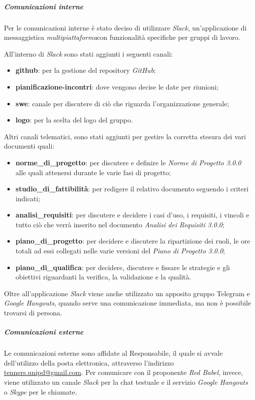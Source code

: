    		\subparagraph*{Comunicazioni interne}
   		Per le comunicazioni interne è stato deciso di utilizzare \textit{ Slack\glos}, un'applicazione di messaggistica \textit{multipiattaforma}\glo con funzionalità specifiche per gruppi di lavoro.

   		\noindent All'interno di \textit{Slack\glo} sono stati aggiunti i seguenti canali:
   		\begin{itemize}
   			\item \textbf{github}: per la gestione del repository \textit{GitHub\glos};
   			\item \textbf{pianificazione-incontri}: dove vengono decise le date per riunioni;
   			\item \textbf{swe}: canale per discutere di ciò che riguarda l'organizzazione generale;
   			\item \textbf{logo}: per la scelta del logo del gruppo.

   		\end{itemize}
   		Altri canali telematici, sono stati aggiunti per gestire la corretta stesura dei vari documenti quali:
   		\begin{itemize}
   			\item \textbf{norme\_di\_progetto}: per discutere e definire le \textit{Norme di Progetto 3.0.0\doc} alle quali attenersi durante le varie fasi di progetto;
   			\item \textbf{studio\_di\_fattibilità}: per redigere il relativo documento seguendo i criteri indicati;
   			\item \textbf{analisi\_requisiti}: per discutere e decidere i casi d'uso, i requisiti, i vincoli e tutto ciò che verrà inserito nel documento \textit{Analisi dei Requisiti 3.0.0\docs};
   			\item \textbf{piano\_di\_progetto}: per decidere e discutere la ripartizione dei ruoli, le ore totali ad essi collegati nelle varie versioni del \textit{Piano di Progetto 3.0.0\docs};
   			\item \textbf{piano\_di\_qualifica}: per decidere, discutere e fissare le strategie e gli obiettivi riguardanti la verifica, la validazione e la qualità.
   		\end{itemize}
   		Oltre all'applicazione \textit{Slack\glo} viene anche utilizzato un apposito gruppo Telegram e \textit{Google Hangouts\glo}, quando serve una comunicazione immediata, ma non è possibile trovarsi di persona.

   		\subparagraph*{Comunicazioni esterne}
   		Le comunicazioni esterne sono affidate al Responsabile, il quale si avvale dell'utilizzo della posta elettronica, attraverso l'indirizzo \href{mailto:tenners.unipd@gmail.com}{tenners.unipd@gmail.com}.
   		Per comunicare con il proponente \textit{Red Babel}, invece, viene utilizzato un canale \textit{Slack\glo} per la chat testuale e il servizio \textit{Google Hangouts\glos} o \textit{Skype\glo} per le chiamate.



